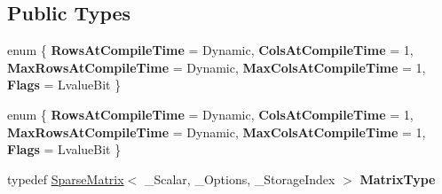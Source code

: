 \subsection*{Public Types}
\begin{DoxyCompactItemize}
\item 
\mbox{\label{struct_eigen_1_1internal_1_1traits_3_01_diagonal_3_01_sparse_matrix_3_01___scalar_00_01___option6bd26e34064fdba33a44f3bb621d4cca_ac569c3ec8cbd704c2655ce522f976a67}} 
enum \{ \newline
{\bfseries Rows\+At\+Compile\+Time} = Dynamic, 
{\bfseries Cols\+At\+Compile\+Time} = 1, 
{\bfseries Max\+Rows\+At\+Compile\+Time} = Dynamic, 
{\bfseries Max\+Cols\+At\+Compile\+Time} = 1, 
\newline
{\bfseries Flags} = Lvalue\+Bit
 \}
\item 
\mbox{\label{struct_eigen_1_1internal_1_1traits_3_01_diagonal_3_01_sparse_matrix_3_01___scalar_00_01___option6bd26e34064fdba33a44f3bb621d4cca_a57078d88d4f6d359702205471915227c}} 
enum \{ \newline
{\bfseries Rows\+At\+Compile\+Time} = Dynamic, 
{\bfseries Cols\+At\+Compile\+Time} = 1, 
{\bfseries Max\+Rows\+At\+Compile\+Time} = Dynamic, 
{\bfseries Max\+Cols\+At\+Compile\+Time} = 1, 
\newline
{\bfseries Flags} = Lvalue\+Bit
 \}
\item 
\mbox{\label{struct_eigen_1_1internal_1_1traits_3_01_diagonal_3_01_sparse_matrix_3_01___scalar_00_01___option6bd26e34064fdba33a44f3bb621d4cca_ab4beea6f7c1dd6c7cf13dbcd3828aa77}} 
typedef \hyperlink{group___sparse_core___module_class_eigen_1_1_sparse_matrix}{Sparse\+Matrix}$<$ \+\_\+\+Scalar, \+\_\+\+Options, \+\_\+\+Storage\+Index $>$ {\bfseries Matrix\+Type}
\item 
\mbox{\label{struct_eigen_1_1internal_1_1traits_3_01_diagonal_3_01_sparse_matrix_3_01___scalar_00_01___option6bd26e34064fdba33a44f3bb621d4cca_abb8902ebfabc70c00e8505b5c3336da1}} 

\end{DoxyCompactItemize}
